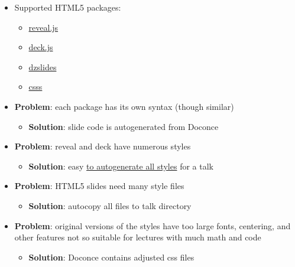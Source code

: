 \documentclass[%
twoside,                 %
final,                   %
chapterprefix=true,      %
open=right               %
10pt]{book}
\newcounter{doconce:movie:counter}
\newcounter{doconce:exercise:counter}
\begin{document}
\begin{itemize}
 \item Supported HTML5 packages:
\begin{itemize}

   \item \href{{http://lab.hakim.se/reveal-js/}}{reveal.js}

   \item \href{{http://imakewebthings.com/deck.js/}}{deck.js}

   \item \href{{http://paulrouget.com/dzslides/}}{dzslides}

   \item \href{{http://leaverou.github.com/csss/#intro}}{csss}

\end{itemize}

\noindent
 \item \textbf{Problem}: each package has its own syntax (though similar)
\begin{itemize}

   \item \textbf{Solution}: slide code is autogenerated from Doconce

\end{itemize}

\noindent
 \item \textbf{Problem}: reveal and deck have numerous styles
\begin{itemize}

   \item \textbf{Solution}: easy \href{{http://hplgit.github.com/teamods/doconce/demo/index.html}}{to autogenerate all styles} for a talk

\end{itemize}

\noindent
 \item \textbf{Problem}: HTML5 slides need many style files
\begin{itemize}

   \item \textbf{Solution}: autocopy all files to talk directory

\end{itemize}

\noindent
 \item \textbf{Problem}: original versions of the styles have too large fonts,
   centering, and other features not so suitable for lectures
   with much math and code
\begin{itemize}

   \item \textbf{Solution}: Doconce contains adjusted css files
\end{itemize}

\noindent
\end{itemize}
\end{document}
